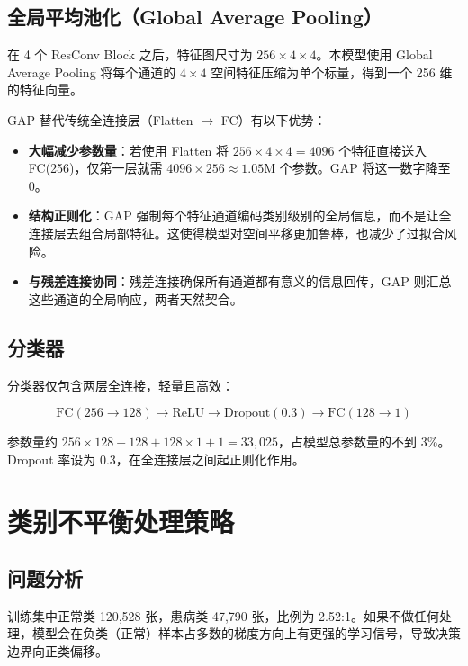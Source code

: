 \documentclass[12pt,a4paper]{ctexart}
\begin{document}
\subsection{全局平均池化（Global Average Pooling）}

在 4 个 ResConv Block 之后，特征图尺寸为 $256 \times 4 \times 4$。本模型使用 Global Average Pooling 将每个通道的 $4\times4$ 空间特征压缩为单个标量，得到一个 256 维的特征向量。

GAP 替代传统全连接层（Flatten $\rightarrow$ FC）有以下优势：

\begin{itemize}
\item \textbf{大幅减少参数量}：若使用 Flatten 将 $256\times4\times4 = 4096$ 个特征直接送入 FC(256)，仅第一层就需 $4096 \times 256 \approx 1.05\text{M}$ 个参数。GAP 将这一数字降至 0。
\item \textbf{结构正则化}：GAP 强制每个特征通道编码类别级别的全局信息，而不是让全连接层去组合局部特征。这使得模型对空间平移更加鲁棒，也减少了过拟合风险。
\item \textbf{与残差连接协同}：残差连接确保所有通道都有意义的信息回传，GAP 则汇总这些通道的全局响应，两者天然契合。
\end{itemize}

\subsection{分类器}

分类器仅包含两层全连接，轻量且高效：

\[
\text{FC}(256 \rightarrow 128) \rightarrow \text{ReLU} \rightarrow \text{Dropout}(0.3) \rightarrow \text{FC}(128 \rightarrow 1)
\]

参数量约 $256 \times 128 + 128 + 128 \times 1 + 1 = 33,\!025$，占模型总参数量的不到 3\%。Dropout 率设为 0.3，在全连接层之间起正则化作用。

\section{类别不平衡处理策略}

\subsection{问题分析}

训练集中正常类 120,528 张，患病类 47,790 张，比例为 2.52:1。如果不做任何处理，模型会在负类（正常）样本占多数的梯度方向上有更强的学习信号，导致决策边界向正类偏移。
\end{document}
